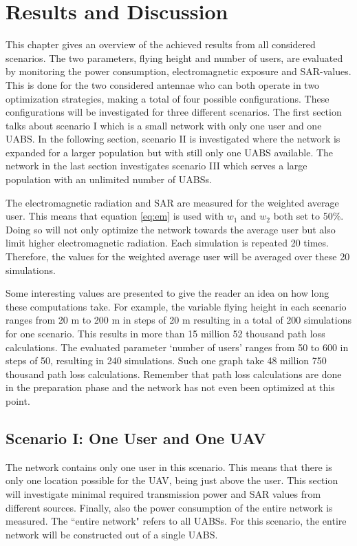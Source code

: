 \chapter{Results and Discussion}
\label{chap:results}

This chapter gives an overview of the achieved results from all considered scenarios. The two parameters,
flying height and number of users, are evaluated by monitoring the power consumption, electromagnetic exposure and \gls{SAR}-values.
This is done for the two considered antennae who can both operate in two optimization strategies, making a total of four possible configurations.
These configurations will be investigated for three different scenarios.
The first section talks about scenario I which is a small network with only one user and one \gls{UABS}. In 
the following section, scenario II is investigated where the network is expanded for a larger population 
but with still only one \gls{UABS} available.
The network in the last section investigates scenario III which serves a large population with an unlimited number of \gls{UABS}s.

The electromagnetic radiation and \gls{SAR} are 
measured for the weighted average user. This means that 
equation \ref{eq:em} is used with $w_{1}$ and $w_{2}$ both set to 50\%. Doing so will not only optimize the network 
towards the average user but also limit higher electromagnetic radiation. Each simulation is repeated 20 times. 
Therefore, the values for the weighted average user will be averaged over these 20 simulations.

Some interesting values are presented to give the reader an idea on how long these computations take.
For example, the variable flying height in each scenario ranges from 
20 m to 200 m in steps of 20 m resulting in a total of 200 simulations for one scenario. 
This results in more than 15 million 52 thousand path loss calculations.
The evaluated parameter  `number of users'
ranges from 50 to 600 in steps of 50, resulting 
in 240 simulations. Such one graph take 48 million 750 thousand path loss calculations. Remember that path loss calculations
are done in the preparation phase and the network has not even been optimized at this point.

\section{Scenario I: One User and One \gls{UAV}}
The network contains only one user in this scenario. This means that there is only one location possible for the \gls{UAV},
being just above 
the user. This section will investigate minimal required transmission power and SAR values from different sources.
Finally, also the power consumption of the entire network is measured. The  ``entire network" refers to all \gls{UABS}s. 
For this scenario, the entire network 
will be constructed out of a single \gls{UABS}.

